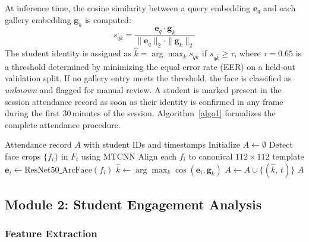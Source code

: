 \documentclass[preprint,12pt]{elsarticle}
\begin{document}
At inference time, the cosine similarity between a query embedding $\mathbf{e}_q$ and each gallery embedding $\mathbf{g}_k$ is computed:
\begin{equation}
s_{qk} = \frac{\mathbf{e}_q \cdot \mathbf{g}_k}{\|\mathbf{e}_q\|_2 \cdot \|\mathbf{g}_k\|_2}
\label{eq:cosine}
\end{equation}
The student identity is assigned as $\hat{k} = \arg\max_k s_{qk}$ if $s_{q\hat{k}} \geq \tau$, where $\tau = 0.65$ is a threshold determined by minimizing the equal error rate (EER) on a held-out validation split. If no gallery entry meets the threshold, the face is classified as \textit{unknown} and flagged for manual review. A student is marked present in the session attendance record as soon as their identity is confirmed in any frame during the first 30\,minutes of the session. Algorithm~\ref{algo1} formalizes the complete attendance procedure.

\begin{algorithm}[H]
    \caption{ArcFace-ResNet-50 Automated Attendance}
    \begin{algorithmic}[1]
         Attendance record $A$ with student IDs and timestamps
        \State Initialize $A \gets \emptyset$
            \State Detect face crops $\{f_i\}$ in $F_t$ using MTCNN
            \State Align each $f_i$ to canonical $112\times112$ template
                \State $\mathbf{e}_i \gets \text{ResNet50\_ArcFace}(f_i)$ 
                \State $\hat{k} \gets \arg\max_{k} \cos(\mathbf{e}_i, \mathbf{g}_k)$
                    \State $A \gets A \cup \{(\hat{k},\, t)\}$ 
                \EndIf
            \EndFor
        \EndFor
        \State \Return $A$
        \EndProcedure
    \end{algorithmic}
    \label{algo1}
\end{algorithm}

\subsection{Module 2: Student Engagement Analysis}

\subsubsection{Feature Extraction}
\end{document}
